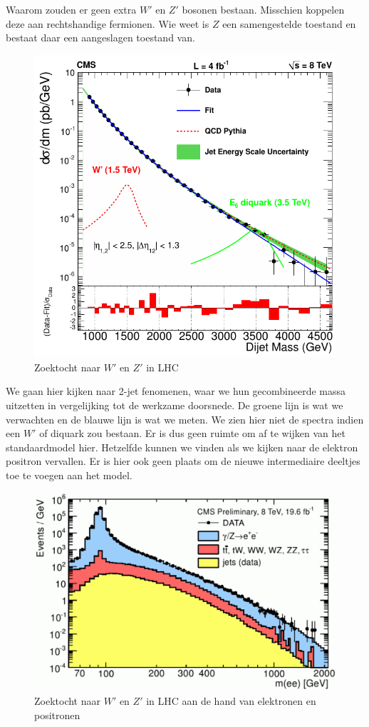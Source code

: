 \documentclass[../main.tex]{subfiles}
\begin{document}
Waarom zouden er geen extra $W'$ en $Z'$ bosonen bestaan. Misschien koppelen deze aan rechtshandige fermionen. Wie weet is $Z$ een samengestelde toestand en bestaat daar een aangeslagen toestand van.

\begin{figure}[h]
    \centering
    \includegraphics[width=0.4\linewidth]{physics_beyond_the_standard_model/cms_w'_z'_zoektocht.png}
    \caption{Zoektocht naar $W'$ en $Z'$ in LHC}%
    \label{fig:physics_beyond_the_standard_model/cms_w'_z'_zoektocht}
\end{figure}

We gaan hier kijken naar 2-jet fenomenen, waar we hun gecombineerde massa uitzetten in vergelijking tot de werkzame doorsnede. De groene lijn is wat we verwachten en de blauwe lijn is wat we meten. We zien hier niet de spectra indien een $W'$ of diquark zou bestaan. Er is dus geen ruimte om af te wijken van het standaardmodel hier. Hetzelfde kunnen we vinden als we kijken naar de elektron positron vervallen. Er is hier ook geen plaats om de nieuwe intermediaire deeltjes toe te voegen aan het model.

\begin{figure}[h]
    \centering
    \includegraphics[width=0.6\linewidth]{physics_beyond_the_standard_model/ee_w'_z'_zoektocht.png}
    \caption{Zoektocht naar $W'$ en $Z'$ in LHC aan de hand van elektronen en positronen}%
    \label{fig:physics_beyond_the_standard_model/ee_w'_z'_zoektocht}
\end{figure}
\end{document}
